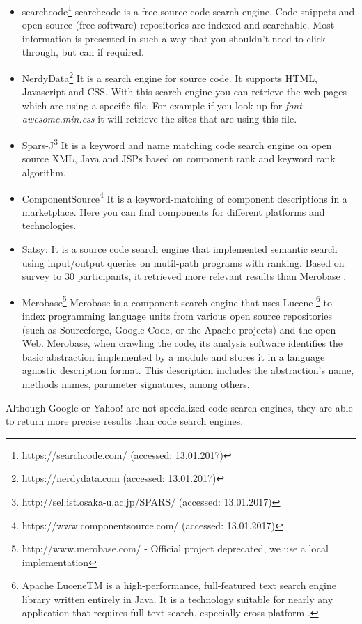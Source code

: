 \begin{itemize}
\item searchcode\footnote{https://searchcode.com/ (accessed: 13.01.2017)} searchcode is a free source code search engine. Code snippets and open source (free software) repositories are indexed and searchable. Most information is presented in such a way that you shouldn't need to click through, but can if required.
\item NerdyData\footnote{https://nerdydata.com (accessed: 13.01.2017)} It is a search engine for source code. It supports HTML, Javascript and CSS. With this search engine you can retrieve the web pages which are using a specific file. For example if you look up for \textit{font-awesome.min.css} it will retrieve the sites that are using this file.
\item Spars-J\footnote{http://sel.ist.osaka-u.ac.jp/SPARS/ (accessed: 13.01.2017)} It is a keyword and name matching code search engine on open source XML, Java and JSPs based on component rank and keyword rank algorithm.
\item ComponentSource\footnote{https://www.componentsource.com/ (accessed: 13.01.2017)} It is a keyword-matching of component descriptions in a marketplace. Here you can find components for different platforms and technologies.
\item Satsy: It is a source code search engine that implemented semantic search using input/output queries on mutil-path programs with ranking. Based on survey to 30 participants, it retrieved more relevant results than Merobase \cite{Stolee2016}.
\item Merobase\footnote{http://www.merobase.com/ - Official project deprecated, we use a local implementation} Merobase is a component search engine that uses Lucene \footnote{Apache LuceneTM is a high-performance, full-featured text search engine library written entirely in Java. It is a technology suitable for nearly any application that requires full-text search, especially cross-platform \cite{lucene}.} to index programming language units from various open source repositories (such as Sourceforge, Google Code, or the Apache projects) and the open Web. Merobase, when crawling the code, its analysis software identifies the basic abstraction implemented by a module and stores it in a language agnostic description format. This description includes the abstraction's name, methods names, parameter signatures, among others.
\end{itemize}

Although Google or Yahoo! are not specialized code search engines, they are able to return more precise results than code search engines\cite{Hummel2007}.

